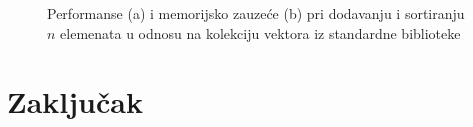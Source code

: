 \documentclass[a4paper]{article}
\begin{document}
\begin{figure}[h!]
    \centering
    \caption{Performanse (a) i memorijsko zauzeće (b) pri dodavanju i sortiranju $n$ elemenata u odnosu na kolekciju vektora iz standardne biblioteke}
    \label{fig:benchmarks-pb-sort}
\end{figure}

\section{Zaključak}

\appendix
 

\end{document}
